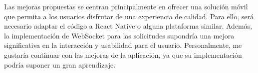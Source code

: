 \vspace{0.5em}
Las mejoras propuestas se centran principalmente en ofrecer una solución móvil que permita a los usuarios disfrutar de una experiencia de calidad. Para ello, será necesario adaptar el código a React Native o alguna plataforma similar. Además, la implementación de WebSocket para las solicitudes supondría una mejora significativa en la interacción y usabilidad para el usuario. Personalmente, me gustaría continuar con las mejoras de la aplicación, ya que su implementación podría suponer un gran aprendizaje.
